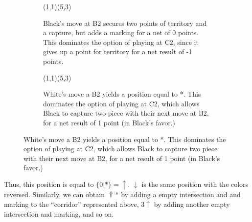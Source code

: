 \documentclass[../math194_paper.tex]{subfiles}
\begin{document}
\begin{figure}[H]
    \centering
    \begin{subfigure}[b]{0.45\linewidth}
    \centering
    \begin{psgopartialboard}{(1,1)(5,3)}
        
        
     \end{psgopartialboard}
    \caption{Black's move at B2 secures two points of territory and a capture, but adds a marking
    for a net of 0 points. This dominates the option of playing at C2, since it gives up a point
    for territory for a net result of -1 points.}
    \end{subfigure}
    \quad
    \begin{subfigure}[b]{0.45\linewidth}
    \centering
    \begin{psgopartialboard}{(1,1)(5,3)}
        
     \end{psgopartialboard}
    \caption{White's move a B2 yields a position equal to *. This dominates the option of playing 
    at C2, which allows Black to capture two piece with their next move at B2, for a net result 
    of 1 point (in Black's favor.)}
    \end{subfigure}
\end{figure}
Thus, this position is equal to $\{0 | *\} = \uparrow$. $\downarrow$ is the same position with the colors reversed.
Similarly, we can obtain $\Uparrow*$ by adding a empty intersection and and marking to the ``corridor'' represented 
above, $3\uparrow$ by adding another empty intersection and marking, and so on.
\end{document}
